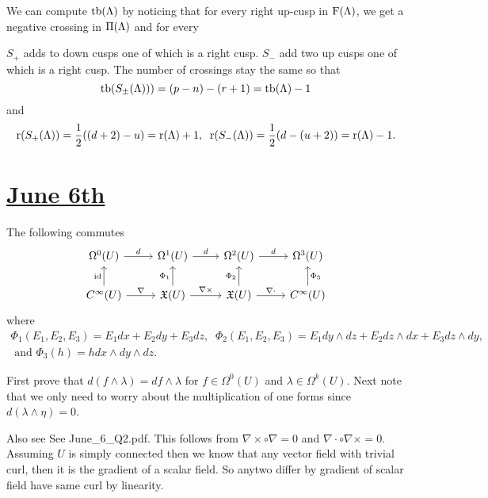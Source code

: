 \documentclass[11pt,letterpaper]{article}
\begin{document}

We can compute $\operatorname{tb}(\Lambda)$ by noticing that for every right up-cusp in $\operatorname{F}(\Lambda)$, we get a negative crossing in $\Pi(\Lambda)$ and for every 


$S_+$ adds to down cusps one of which is a right cusp. $S_-$ add two up cusps one of which is a right cusp. The number of crossings stay the same so that
    \[\operatorname{tb}(S_\pm(\Lambda)))=(p-n)-(r+1)=\operatorname{tb}(\Lambda)-1\]
and
    \[\operatorname{r}(S_+(\Lambda))=\frac{1}{2}((d+2)-u)=\operatorname{r}(\Lambda)+1,\;\; \operatorname{r}(S_-(\Lambda))=\frac{1}{2}(d-(u+2))=\operatorname{r}(\Lambda)-1.\]

\section*{\underline{June 6th}}

The following commutes
\[\begin{tikzcd}[ampersand replacement=\&]
	{\Omega^0(U)} \& {\Omega^1(U)} \& {\Omega^2(U)} \& {\Omega^3(U)} \\
	{C^\infty(U)} \& {\mathfrak{X}(U)} \& {\mathfrak{X}(U)} \& {C^\infty(U)}
	\arrow["d", from=1-1, to=1-2]
	\arrow["d", from=1-2, to=1-3]
	\arrow["d", from=1-3, to=1-4]
	\arrow["\id", from=2-1, to=1-1]
	\arrow["{\Phi_1}", from=2-2, to=1-2]
	\arrow["{\Phi_2}", from=2-3, to=1-3]
	\arrow["{\Phi_3}"', from=2-4, to=1-4]
	\arrow["\nabla", from=2-1, to=2-2]
	\arrow["{\nabla \times}", from=2-2, to=2-3]
	\arrow["\nabla\cdot", from=2-3, to=2-4]
\end{tikzcd}\]
where 
\begin{multline*}
    \Phi_1(E_1,E_2,E_3)=E_1dx+E_2dy+E_3dz, \;\; \Phi_2(E_1,E_2,E_3)= E_1 dy\wedge dz+E_2 dz\wedge dx + E_3 dz \wedge dy, \\ \text{ and } \Phi_3(h)= h dx \wedge dy \wedge dz.
\end{multline*}

\TODO
{}
First prove that $d(f\wedge \lambda)=df\wedge \lambda$ for $f\in \Omega^0(U)$ and $\lambda \in \Omega^k(U)$. Next note that we only need to worry about the multiplication of one forms since $d(\lambda\wedge \eta)=0$.

Also see See June\_6\_Q2.pdf.
This follows from $\nabla\times \circ \nabla=0$ and $\nabla \cdot 
 \circ \nabla \times =0$.
Assuming $U$ is simply connected then we know that any vector field with trivial curl, then it is the gradient of a scalar field. So anytwo differ by gradient of scalar field have same curl by linearity.
\end{document}
